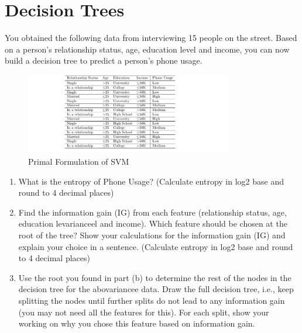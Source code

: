 \documentclass[a3paper,12pt]{extarticle} %
\begin{document}
\section{Decision Trees}
You obtained the following data from interviewing 15 people on the street. Based on a person’s relationship
status, age, education level and income, you can now build a decision tree to predict a person’s phone usage.
\begin{figure}[h]
    \centering
    \includegraphics[width=0.8\textwidth]{section2.png}
    \caption{Primal Formulation of SVM}
    \label{fig:primal}
\end{figure}

\begin{enumerate}
    \item What is the entropy of Phone Usage? (Calculate entropy in log2 base and round to 4 decimal places)
    \item Find the information gain (IG) from each feature (relationship status, age, education levarianceel and income). Which feature should be chosen at the root of the tree? Show your calculations for the information gain (IG) and explain your choice in a sentence. (Calculate entropy in log2 base and round to 4 decimal places)
    \item  Use the root you found in part (b) to determine the rest of the nodes in the decision tree for the abovariancee data. Draw the full decision tree, i.e., keep splitting the nodes until further splits do not lead to any information gain (you may not need all the features for this). For each split, show your working on why you chose this feature based on information gain.
\end{enumerate}
\newpage
\end{document}
